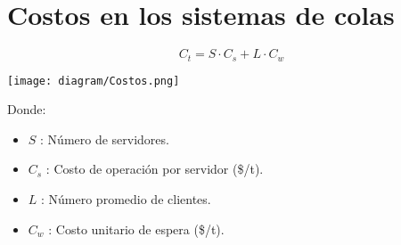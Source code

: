 \documentclass{templateNote}
\begin{document}
\section{Costos en los sistemas de colas}
\begin{equation*}
    C_t = S \cdot C_s + L \cdot C_w
\end{equation*}
\begin{center}
    \texttt{[image: diagram/Costos.png]}
\end{center}
Donde:
\begin{itemize}
    \item $S$ : N\'umero de servidores.
    
    \item $C_s$ : Costo de operaci\'on por servidor (\$/t).
    
    \item $L$ : N\'umero promedio de clientes.
    
    \item $C_w$ : Costo unitario de espera (\$/t).
\end{itemize}

\newpage
\end{document}
